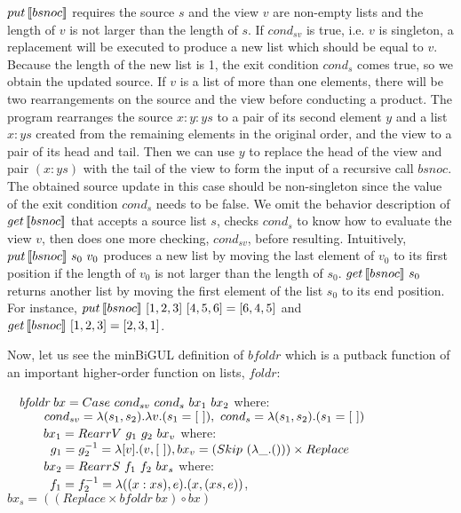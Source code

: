 $put \, [\![bsnoc]\!]$ requires the source $s$ and the view $v$ are non-empty lists and the length of $v$ is not larger than the length of $s$. If $cond_{sv}$ is true, i.e. $v$ is singleton, a replacement will be executed to produce a new list which should be equal to $v$. Because the length of the new list is 1, the exit condition $cond_s$ comes true, so we obtain the updated source. If $v$ is a list of more than one elements, there will be two rearrangements on the source and the view before conducting a product. The program rearranges the source $x:y:ys$ to a pair of its second element $y$ and a list $x:ys$ created from the remaining elements in the original order, and the view to a pair of its head and tail. Then we can use $y$ to replace the head of the view and pair $(x:ys)$ with the tail of the view to form the input of a recursive call $\textit{bsnoc}$. The obtained source update in this case should be non-singleton since the value of the exit condition $cond_s$ needs to be false. We omit the behavior description of $get \, [\![bsnoc]\!]$ that accepts a source list $s$, checks $cond_s$ to know how to evaluate the view $v$, then does one more checking, $cond_{sv}$, before resulting. 
%
Intuitively, $put \, [\![bsnoc]\!] \ s_0 \ v_0$ produces a new list by moving the last element of $v_0$ to its first position if the length of $v_0$ is not larger than the length of $s_0$. $get \, [\![bsnoc]\!] \ s_0$ returns another list by moving the first element of the list $s_0$ to its end position. For instance, $put \, [\![bsnoc]\!] \ [1,2,3] \ [4,5,6] = [6,4,5]$ and $get \, [\![bsnoc]\!] \ [1,2,3] = [2,3,1]$.

Now, let us see the minBiGUL definition of $\textit{bfoldr}$ which is a putback function of an important higher-order function on lists, $\textit{foldr}$:

\smallvspace
$\tab \textit{bfoldr} \ bx = Case \ cond_{sv} \ cond_s \ bx_1 \ bx_2$ where:\\
$\tabs{3} \ cond_{sv} = \lambda (s_1,s_2).\lambda v.(s_1 = [\ ]), \ cond_s = \lambda (s_1,s_2).(s_1 = [\ ])$\\
$\tabs{3} \ bx_1 = RearrV \ g_1 \ g_2 \ bx_v$ where: \\
    $\tabs{4} g_1 = g_2^{-1} = \lambda [v].(v,[\ ]), bx_v = (Skip \ (\lambda \_.())) \times Replace$\\
$\tabs{3} \ bx_2 = RearrS \ f_1 \ f_2 \ bx_s$ where:\\
    $\tabs{4} f_1 = f_2^{-1} = \lambda ((x:xs),e).(x,(xs,e))$, 
$bx_s = ((Replace \times \textit{bfoldr} \ bx) \circ bx)$
\smallvspace


